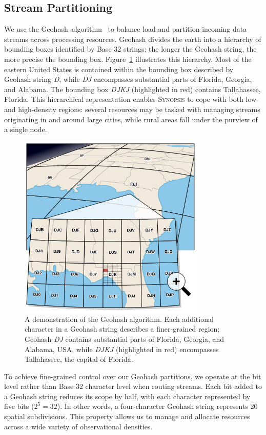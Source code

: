 \subsection{Stream Partitioning}
We use the Geohash~algorithm~\cite{geohash} to balance load and partition incoming data streams across processing resources. Geohash divides the earth into a hierarchy of bounding boxes identified by Base 32 strings; the longer the Geohash string, the more precise the bounding box. Figure~\ref{fig:geohash} illustrates this hierarchy. Most of the eastern United States is contained within the bounding box described by Geohash string \emph{D}, while \emph{DJ} encompasses substantial parts of Florida, Georgia, and Alabama. The bounding box \emph{DJKJ} (highlighted in red) contains Tallahassee, Florida. This hierarchical representation enables \textsc{Synopsis} to cope with both low- and high-density regions: several resources may be tasked with managing streams originating in and around large cities, while rural areas fall under the purview of a single node.

\begin{figure}
    \centerline{\includegraphics[width=3.5in]{figures/geohash.pdf}}
    \caption{A demonstration of the Geohash algorithm. Each additional character in a Geohash string describes a finer-grained region; Geohash \emph{DJ} contains substantial parts of Florida, Georgia, and Alabama, USA, while \emph{DJKJ} (highlighted in red) encompasses Tallahassee, the capital of Florida.}
    \label{fig:geohash}
\end{figure}

To achieve fine-grained control over our Geohash partitions, we operate at the bit level rather than Base 32 character level when routing streams. Each bit added to a Geohash string reduces its scope by half, with each character represented by five bits ($2^5 = 32$). In other words, a four-character Geohash string represents 20 spatial subdivisions. This property allows us to manage and allocate resources across a wide variety of observational densities.

